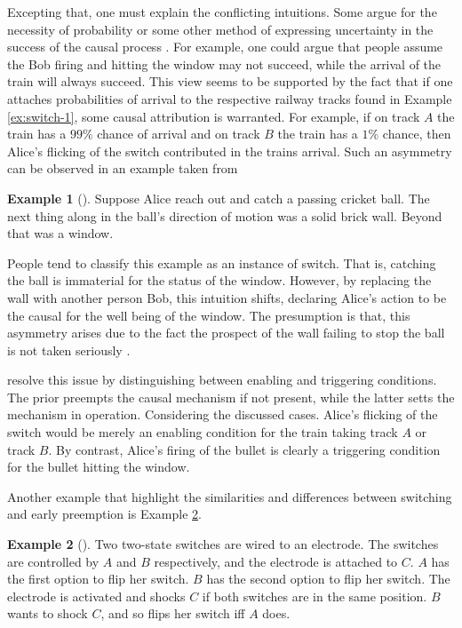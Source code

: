 \documentclass[11pt,a4paper]{book}
\theoremstyle{definition}
\theoremstyle{definition}
\newtheorem{example}{Example}[section]
\theoremstyle{definition}
\theoremstyle{remark}
\begin{document}
Excepting that, one must explain the conflicting intuitions. Some argue for the necessity of probability or some other method of expressing uncertainty in the success of the causal process \parencite{beckers2018principled,hall2007structural}. For example, one could argue that people assume the Bob firing and hitting the window may not succeed, while the arrival of the train will always succeed. 
This view seems to be supported by the fact that if one attaches probabilities of arrival to the respective railway tracks found in Example \ref{ex:switch-1}, some causal attribution is warranted. 
For example, if on track $A$ the train has a $99\%$ chance of arrival and on track $B$ the train has a $1\%$ chance, then Alice's flicking of the switch contributed in the trains arrival.
Such an asymmetry can be observed in an example taken from \parencite{beckers2018principled}
 \begin{example}[\cite{beckers2018principled}]
\label{ex:early-preemption-3}
Suppose Alice reach out and catch a passing cricket ball. The next thing along in the ball’s direction of motion was a solid brick wall. Beyond that was a window.
\end{example}
People tend to classify this example as an instance of switch. That is, catching the ball is immaterial for the status of the window.
However, by replacing the wall with another person Bob, this intuition shifts, declaring Alice's action to be the causal for the well being of the window.
The presumption is that, this asymmetry arises due to the fact the prospect of the wall failing to stop the ball is not taken seriously \parencite{beckers2018principled,blanchard2017cause}.

\parencite{denecker2019explaining} resolve this issue by distinguishing between enabling and triggering conditions. 
The prior preempts the causal mechanism if not present, while the latter setts the mechanism in operation.
Considering the discussed cases. Alice's flicking of the switch would be merely an enabling condition for the train taking track $A$ or track $B$. By contrast, Alice's firing of the bullet is clearly a triggering condition for the bullet hitting the window.


Another example that highlight the similarities and differences between switching and early preemption is Example \ref{ex:early-preemption-3}.

 \begin{example}[\cite{weslake2015partial}]
\label{ex:early-preemption-3}
Two two-state switches are wired to an electrode. The switches are controlled by $A$ and $B$ respectively, and the electrode is attached to $C$. $A$ has the first option to flip her switch. $B$ has the second option to flip her switch. The electrode is activated and shocks $C$  if both switches are in the same position. $B$ wants to shock $C$, and so flips her switch iff $A$ does.
 \end{example}
 
\end{document}
